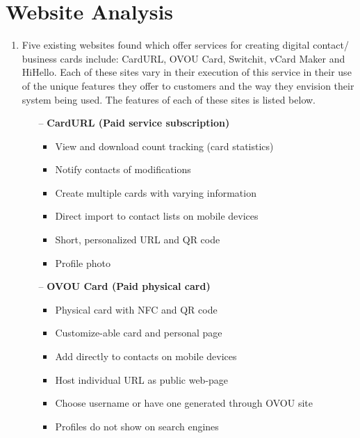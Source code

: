 \documentclass[12pt]{article}%
\begin{document}
\section{Website Analysis}
    \begin{enumerate}[2.a.]

        \item Five existing websites found which offer services for creating digital contact/ business cards include: CardURL, OVOU Card, Switchit, vCard Maker and HiHello. Each of these sites vary in their execution of this service in their use of the unique features they offer to customers and the way they envision their system being used. The features of each of these sites is listed below.

        \begin{enumerate}
            \item [--] \textbf{CardURL (Paid service subscription)}

            \begin{itemize}
                \item View and download count tracking (card statistics)
                \item Notify contacts of modifications
                \item Create multiple cards with varying information
                \item Direct import to contact lists on mobile devices
                \item Short, personalized URL and QR code
                \item Profile photo
            \end{itemize}

            \item [--] \textbf{OVOU Card (Paid physical card)}


            \begin{itemize}
                \item Physical card with NFC and QR code
                \item Customize-able card and personal page
                \item Add directly to contacts on mobile devices
                \item Host individual URL as public web-page
                \item Choose username or have one generated through OVOU site
                \item Profiles do not show on search engines
            \end{itemize}


\end{enumerate}
\end{enumerate}
\end{document}
